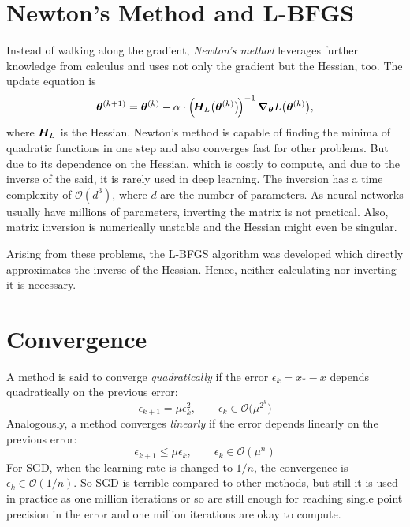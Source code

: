 	\section{Newton's Method and L-BFGS}
		Instead of walking along the gradient, \emph{Newton's method} leverages further knowledge from calculus and uses not only the gradient but the Hessian, too. The update equation is
		\begin{equation}
			\bm{\theta}^{(k + 1)} = \bm{\theta}^{(k)} - \alpha \cdot \Bigl(\!\bm{H}_L\bigl( \bm{\theta}^{(k)} \bigr)\!\Bigr)^{-1} \, \grad_{\bm{\theta}} L\bigl( \bm{\theta}^{(k)} \bigr),
		\end{equation}
		where \(\bm{H}_L\) is the Hessian. Newton's method is capable of finding the minima of quadratic functions in one step and also converges fast for other problems. But due to its dependence on the Hessian, which is costly to compute, and due to the inverse of the said, it is rarely used in deep learning. The inversion has a time complexity of \( \mathcal{O}(d^3) \), where \(d\) are the number of parameters. As neural networks usually have millions of parameters, inverting the matrix is not practical. Also, matrix inversion is numerically unstable and the Hessian might even be singular.

		Arising from these problems, the L-BFGS algorithm was developed which directly approximates the inverse of the Hessian. Hence, neither calculating nor inverting it is necessary.

	\section{Convergence}
		A method is said to converge \emph{quadratically} if the error \( \epsilon_k = x_\ast - x \) depends quadratically on the previous error:
		\begin{equation}
			\epsilon_{k + 1} = \mu \epsilon_k^2,\qquad \epsilon_k \in \mathcal{O}\bigl(\mu^{2^k}\bigr)
		\end{equation}
		Analogously, a method converges \emph{linearly} if the error depends linearly on the previous error:
		\begin{equation}
			\epsilon_{k + 1} \leq \mu \epsilon_k,\qquad \epsilon_k \in \mathcal{O}(\mu^n)
		\end{equation}
		For SGD, when the learning rate is changed to \(1/n\), the convergence is \( \epsilon_k \in \mathcal{O}(1/n) \). So SGD is terrible compared to other methods, but still it is used in practice as one million iterations or so are still enough for reaching single point precision in the error and one million iterations are okay to compute.

